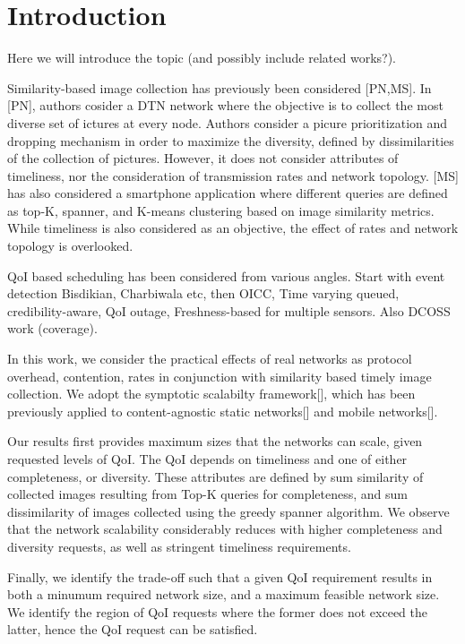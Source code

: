 
\section{Introduction}
\label{sec:intro}

Here we will introduce the topic (and possibly include related works?).


Similarity-based image collection has previously been considered [PN,MS]. In [PN], authors cosider a DTN network where the objective is to collect the most diverse set of ictures at every node. Authors consider a picure prioritization and dropping mechanism in order to maximize the diversity, defined by dissimilarities of the collection of pictures. However, it does not consider attributes of timeliness, nor the consideration of transmission rates and network topology. [MS] has also considered a smartphone application where different queries are defined as top-K, spanner, and K-means clustering based on image similarity metrics. While timeliness is also considered as an objective, the effect of rates and network topology is overlooked.

QoI based scheduling has been considered from various angles. Start with event detection Bisdikian, Charbiwala etc, then OICC, Time varying queued, credibility-aware, QoI outage, Freshness-based for multiple sensors. Also DCOSS work (coverage).


In this work, we consider the practical effects of real networks as protocol overhead, contention, rates in conjunction with similarity based timely image collection. We adopt the symptotic scalabilty framework[], which has been previously applied to content-agnostic static networks[] and mobile networks[].

Our results first provides maximum sizes that the networks can scale, given requested levels of QoI. The QoI depends on timeliness and one of either completeness, or diversity. These attributes are defined by sum similarity of collected images resulting from Top-K queries for completeness, and sum dissimilarity of images collected using the greedy spanner algorithm. We observe that the network scalability considerably reduces with higher completeness and diversity requests, as well as stringent timeliness requirements. 

Finally, we identify the trade-off such that a given QoI requirement results in both a minumum required network size, and a maximum feasible network size. We identify the region of QoI requests where the former does not exceed the latter, hence the QoI request can be satisfied. 